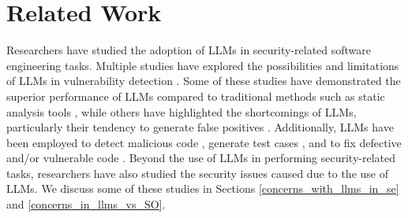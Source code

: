 \section{Related Work}



Researchers have studied the adoption of LLMs in security-related software engineering tasks. Multiple studies have explored the possibilities and limitations of LLMs in vulnerability detection \citep{zhou2024large, noever2023can, bakhshandeh2023using, purba2023software, cheshkov2023evaluation, wang2023defecthunter, liu2023harnessing}. Some of these studies have demonstrated the superior performance of LLMs compared to traditional methods such as static analysis tools \citep{zhou2024large, noever2023can, bakhshandeh2023using}, while others have highlighted the shortcomings of LLMs, particularly their tendency to generate false positives \citep{purba2023software, cheshkov2023evaluation, Banerjee23}. Additionally, LLMs have been employed to detect malicious code \citep{plate, eli}, generate test cases \citep{yao2023llm, zhang2023well}, and to fix defective and/or vulnerable code \citep{jiang2023impact, pearce2023examining, xia2022practical, jin2023inferfix}. Beyond the use of LLMs in performing security-related tasks, researchers have also studied the security issues caused due to the use of LLMs. We discuss some of these studies in Sections \ref{concerns_with_llms_in_se} and \ref{concerns_in_llms_vs_SO}.

